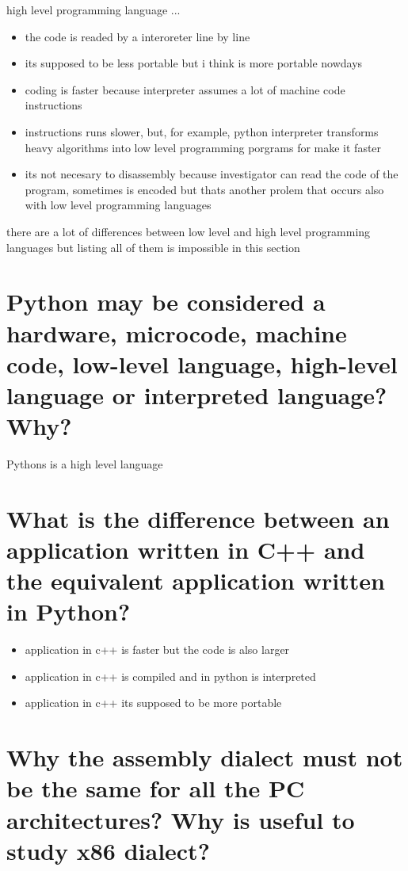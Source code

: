 \documentclass[10pt,a4paper]{article} %
\begin{document}
        \color{red} high level programming language ... \color{white}
        \begin{itemize}
            \item {the code is readed by a interoreter line by line}
            \item {its supposed to be less portable but i think is more
                portable nowdays}
            \item {coding is faster because interpreter assumes a lot of
                machine code instructions}
            \item {instructions runs slower, but, for example, python
                interpreter transforms heavy algorithms into low level
            programming porgrams for make it faster}
            \item {its not necesary to disassembly because investigator can
                read the code of the program, sometimes is encoded but thats
                another prolem that occurs also with low level programming
                languages}
        \end{itemize}
        there are a lot of differences between low level and high level
        programming languages but listing all of them is impossible in this
        section

    \section{Python may be considered a hardware, microcode, machine code,
    low-level language, high-level language or interpreted language? Why?}
        Pythons is a high level language

    \section{What is the difference between an application written in C++ and
    the equivalent application written in Python?}
        \begin{itemize}
            \item {application in c++ is faster but the code is also larger}
            \item {application in c++ is compiled and in python is interpreted}
            \item {application in c++ its supposed to be more portable}
        \end{itemize}

    \section{Why the assembly dialect must not be the same for all the PC
        architectures? Why is useful to study x86 dialect?}
\end{document}
